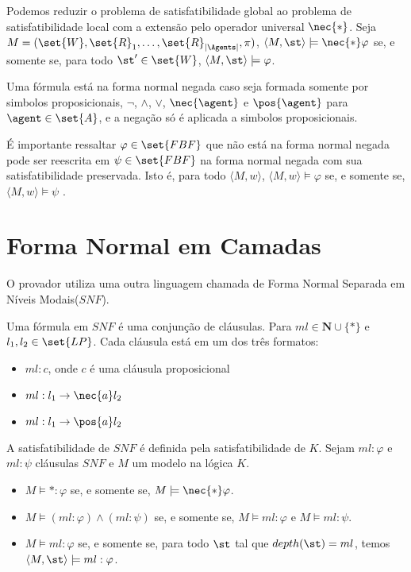 Podemos reduzir o problema de satisfatibilidade global ao problema de satisfatibilidade local com a extensão pelo operador universal $\nec{*}$. Seja $M = (\set{W}, \set{R}_1, \ldots, \set{R}_{|\Agents|}, \pi)$, $\langle M,\st \rangle \models \nec{*}\varphi$ se, e somente se, para todo $\st' \in \set{W}$, $\langle M,\st \rangle \models \varphi$.


\begin{definition}
	Uma fórmula está na forma normal negada caso seja formada somente por simbolos proposicionais, $\neg$, $\land$, $\lor$, $\nec{\agent}$ e $\pos{\agent}$ para $\agent \in \set{A}$, e a negação só é aplicada a simbolos proposicionais.
\end{definition}

É importante ressaltar $\varphi \in \set{FBF}$ que não está na forma normal negada pode ser reescrita em $\psi \in \set{FBF}$ na forma normal negada com sua satisfatibilidade preservada. Isto é, para todo $\langle M, w \rangle$, $\langle M, w \rangle \models \varphi$ se, e somente se, $\langle M, w \rangle \models \psi$ \cite{alguemqueprovaisso}. %

\section{Forma Normal em Camadas}
O provador utiliza uma outra linguagem chamada de Forma Normal Separada em Níveis Modais($SNF$).

\begin{definition}
	Uma fórmula em $SNF$ é uma conjunção de cláusulas. Para $ml \in \mathbf{N} \cup \{*\}$ e $l_1, l_2 \in \set{LP}$. Cada cláusula está em um dos três formatos:
	\begin{itemize}
		\item $ml: c$, onde $c$ é uma cláusula proposicional
		\item $ml: l_1 \rightarrow \nec{a}l_2$
		\item $ml: l_1 \rightarrow \pos{a}l_2$
	\end{itemize}
\end{definition}

A satisfatibilidade de $SNF$ é definida pela satisfatibilidade de $K$. Sejam $ml: \varphi$ e $ml: \psi$ cláusulas $SNF$ e $M$ um modelo na lógica $K$.

\begin{itemize}
	\item $M \models *: \varphi$ se, e somente se, $M \models \nec{*}\varphi$.
	\item $M \models (ml: \varphi) \land (ml: \psi)$ se, e somente se, $M \models ml: \varphi$ e $M \models ml: \psi$.
	\item $M \models ml: \varphi$ se, e somente se, para todo $\st$ tal que $depth(\st) = ml$, temos $\langle M, \st \rangle \models ml: \varphi$.
\end{itemize}

